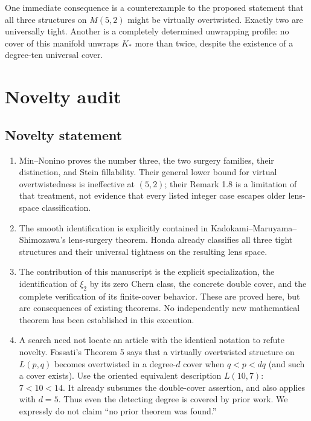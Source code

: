 \documentclass[12pt]{amsart}
\theoremstyle{definition}
\theoremstyle{remark}
\numberwithin{equation}{section}
\theoremstyle{definition}
\begin{document}
One immediate consequence is a counterexample to the proposed statement that all three structures on $M(5,2)$ might be virtually overtwisted. Exactly two are universally tight. Another is a completely determined unwrapping profile: no cover of this manifold unwraps $K_*$ more than twice, despite the existence of a degree-ten universal cover.

\section{Novelty audit}\label{en-novelty}
\subsection{Novelty statement}
\begin{enumerate}
\item Min--Nonino proves the number three, the two surgery families, their distinction, and Stein fillability. Their general lower bound for virtual overtwistedness is ineffective at $(5,2)$; their Remark 1.8 is a limitation of that treatment, not evidence that every listed integer case escapes older lens-space classification.
\item The smooth identification is explicitly contained in Kadokami--\allowbreak Maruyama--\allowbreak Shimozawa's lens-surgery theorem. Honda already classifies all three tight structures and their universal tightness on the resulting lens space.
\item The contribution of this manuscript is the explicit specialization, the identification of $\xi_2$ by its zero Chern class, the concrete double cover, and the complete verification of its finite-cover behavior. These are proved here, but are consequences of existing theorems. No independently new mathematical theorem has been established in this execution.
\item A search need not locate an article with the identical notation to refute novelty. Fossati's Theorem 5 says that a virtually overtwisted structure on $L(p,q)$ becomes overtwisted in a degree-$d$ cover when $q<p<dq$ (and such a cover exists). Use the oriented equivalent description $L(10,7)$: $7<10<14$. It already subsumes the double-cover assertion, and also applies with $d=5$. Thus even the detecting degree is covered by prior work. We expressly do not claim ``no prior theorem was found.''
\end{enumerate}
\end{document}
